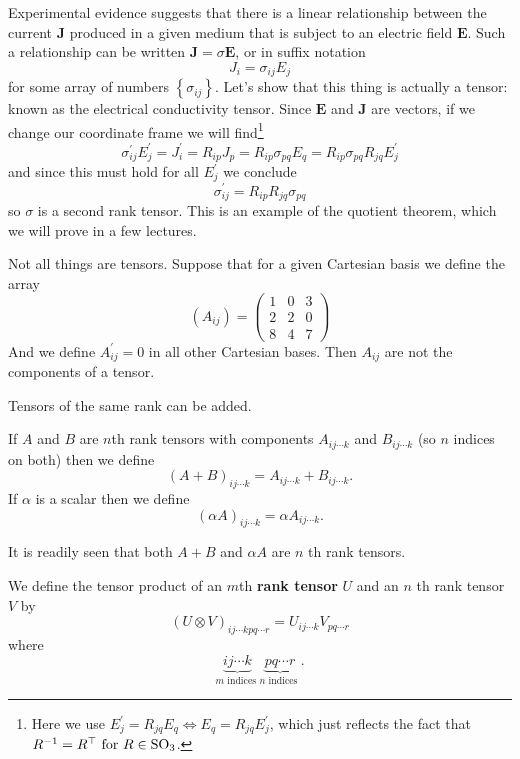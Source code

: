 \begin{example}
    Experimental evidence suggests that there is a linear relationship between the current $\mathbf{J}$ produced in a given medium that is subject to an electric field $\mathbf{E}$. Such a
    relationship can be written $\mathbf{J}=\sigma \mathbf{E}$, or in suffix notation
    \[
    J_{i}=\sigma_{i j} E_{j}
    \]
    for some array of numbers $\left\{\sigma_{i j}\right\}$. Let's show that this thing is actually a tensor: known as the electrical conductivity tensor. Since $\mathbf{E}$ and $\mathbf{J}$ are vectors, if we change our coordinate frame we will find\footnote{Here we use $E_{j}^{\prime}=R_{j q} E_{q} \Leftrightarrow E_{q}=R_{j q} E_{j}^{\prime}$, which just reflects the fact that $R^{-1}=R^{\top } \text { for } R \in \mathrm{SO}_3$.}
    \[
    \sigma_{i j}^{\prime} E_{j}^{\prime}=J_{i}^{\prime}=R_{i p} J_{p}=R_{i p} \sigma_{p q} E_{q}=R_{i p} \sigma_{p q} R_{j q} E_{j}^{\prime}
    \]
    and since this must hold for all $E_{j}^{\prime}$ we conclude
    \[
    \sigma_{i j}^{\prime}=R_{i p} R_{j q} \sigma_{p q}
    \]
    so $\sigma$ is a second rank tensor. This is an example of the quotient theorem, which we will
    prove in a few lectures.
\end{example}
\begin{example}
    Not all things are tensors. Suppose that for a given Cartesian basis we define
    the array
    \[
    \left(A_{i j}\right)=\begin{pmatrix}
        1 & 0 & 3 \\
    2 & 2 & 0 \\
    8 & 4 & 7
    \end{pmatrix}
    \]
    And we define $A_{i j}^{\prime}=0$ in all other Cartesian bases. Then $A_{i j}$ are not the components of
    a tensor.
\end{example}

Tensors of the same rank can be added. 
\begin{definition}
    If $A$ and $B$ are $n$th rank tensors with components $A_{i j \cdots k}$ and $B_{i j \cdots k}$ (so $n$ indices on both) then we define
    \[
    (A+B)_{i j \cdots k}=A_{i j \cdots k}+B_{i j \cdots k}.
    \]
    If $\alpha$ is a scalar then we define
    \[
    (\alpha A)_{i j \cdots k}=\alpha A_{i j \cdots k}.
    \]
\end{definition}
It is readily seen that both $A+B$ and $\alpha A$ are $n$ th rank tensors. \begin{definition}
    We define the tensor
    product of an $m$th \textbf{rank tensor} $U$ and an $n$ th rank tensor $V$ by
    \[
    (U \otimes V)_{i j \cdots k p q \cdots r}=U_{i j \cdots k} V_{p q \cdots r}
    \]
    where
    \[
    \underbrace{i j \cdots k}_{m \text { indices }} \underbrace{p q \cdots r}_{n \text { indices }}.
    \]
\end{definition}

